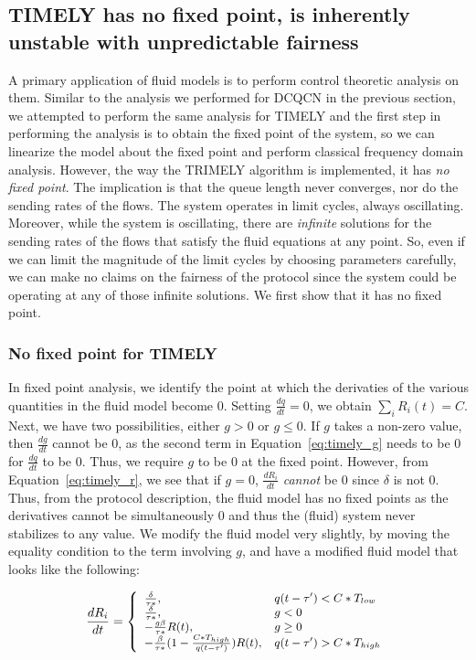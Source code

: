 \subsection{TIMELY has no fixed point, is inherently unstable with unpredictable fairness}
A primary application of fluid models is to perform control theoretic analysis on them. Similar to the analysis we performed for DCQCN in the previous section, we attempted to perform the same analysis for TIMELY and the first step in performing the analysis is to obtain the fixed point of the system, so we can linearize the model about the fixed point and perform classical frequency domain analysis. However, the way the TRIMELY algorithm is implemented, it has \emph{no fixed point}. The implication is that the queue length never converges, nor do the sending rates of the flows. The system operates in limit cycles, always oscillating. Moreover, while the system is oscillating, there are \emph{infinite} solutions for the sending rates of the flows that satisfy the fluid equations at any point. So, even if we can limit the magnitude of the limit cycles by choosing parameters carefully, we can make no claims on the fairness of the protocol since the system could be operating at any of those infinite solutions. We first show that it has no fixed point.

\subsubsection{No fixed point for TIMELY}
In fixed point analysis, we identify the point at which the derivaties of the various quantities in the fluid model become 0.  Setting $\tfrac{dq}{dt} = 0$, we obtain $\sum_{i} R_i(t) = C$. Next, we have two possibilities, either $g > 0$ or $g  \le 0$. If $g$ takes a non-zero value, then $\tfrac{dg}{dt}$ cannot be 0, as the second term in Equation~\ref{eq:timely_g} needs to be 0 for $\tfrac{dq}{dt}$ to be 0. Thus, we require $g$ to be 0 at the fixed point. However, from Equation~\ref{eq:timely_r}, we see that if $g = 0$, $\tfrac{dR_i}{dt}$ \emph{cannot} be 0 since $\delta$ is not 0. Thus, from the protocol description, the fluid model has no fixed points as the derivatives cannot be simultaneously 0 and thus the (fluid) system never stabilizes to any value. We modify the fluid model very slightly, by moving the equality condition to the term involving $g$, and have a modified fluid model that looks like the following:

\begin{equation}
\small
\frac{{dR_i}}{{dt}} = \left\{ \begin{array}{ll}
\frac{\delta }{{\tau *}}, & q(t - \tau ') < C*{T_{low}}\\
\frac{\delta }{{\tau *}}, & g < 0\\
 - \frac{{g\beta }}{{\tau *}}R(t), & g \ge 0\\
 - \frac{\beta }{{\tau *}}(1 - \frac{{C*{T_{high}}}}{{q(t - \tau ')}})R(t), & q(t - \tau ') > C*{T_{high}}
\end{array} \right.\\
\label{eq:timely_r_modified}
\end{equation}
